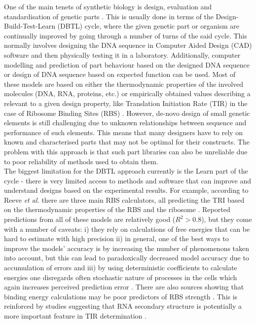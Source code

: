 \documentclass{article}
\begin{document}
One of the main tenets of synthetic biology is design, evaluation and standardisation of genetic parts \cite{Brophy2014,Canton2008,Stanton2014}.
This is usually done in terms of the Design-Build-Test-Learn (DBTL) cycle, where the given genetic part or organism are continually improved by going through a number of turns of the said cycle.
This normally involves designing the DNA sequence in Computer Aided Design (CAD) software and then physically testing it in a laboratory. 
Additionally, computer modelling and prediction of part behaviour based on the designed DNA sequence or design of DNA sequence based on expected function can be used\cite{Yeoh2019,Nielsen2016}.
Most of these models are based on either the thermodynamic properties of the involved molecules (DNA, RNA, proteins, etc.) or empirically obtained values describing a relevant to a given design property, like Translation Initiation Rate (TIR) in the case of Ribosome Binding Sites (RBS) \cite{Xia1998,Chen2013,Reeve2014}.
However, de-novo design of small genetic elements is still challenging due to unknown relationships between sequence and performance of such elements. 
This means that many designers have to rely on known and characterised parts that may not be optimal for their constructs.
The problem with this approach is that such part libraries can also be unreliable due to poor reliability of methods used to obtain them.\\
The biggest limitation for the DBTL approach currently is the Learn part of the cycle - there is very limited access to methods and software that can improve and understand designs based on the experimental results.
For example, according to Reeve \emph{et al.} there are three main RBS calculators, all predicting the TRI based on the thermodynamic properties of the RBS and the ribosome \cite{Seo2013,Na2010,Salis2009}. 
Reported predictions from all of these models are relatively good ($R^2 >0.8$), but they come with a number of caveats: i) they rely on calculations of free energies that can be hard to estimate with high precision ii) in general, one of the best ways to improve the models' accuracy is by increasing the number of phenomenons taken into account, but this can lead to paradoxically decreased model accuracy due to accumulation of errors \cite{EspahBorujeni2016} and iii) by using deterministic coefficients to calculate energies one disregards often stochastic nature of processes in the cells which again increases perceived prediction error \cite{Goss1998}. 
There are also sources showing that binding energy calculations may be poor predictors of RBS strength \cite{Saito2020,Sherer1980} . This is reinforced by studies suggesting that RNA secondary structure is potentially a more important feature in TIR determination \cite{DESMIT1994,EspahBorujeni2016} .\\
\end{document}

